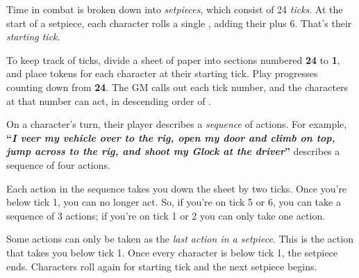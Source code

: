 
Time in combat is broken down into \emph{setpieces}, which consist of 24 \emph{ticks}. At the start of a setpiece, each character rolls a single , adding their  plus 6. That's their \emph{starting tick}.

To keep track of ticks, divide a sheet of paper into sections numbered \textbf{24} to \textbf{1}, and place tokens for each character at their starting tick. Play progresses counting down from \textbf{24}. The GM calls out each tick number, and the characters at that number can act, in descending order of .

On a character's turn, their player describes a \emph{sequence} of actions. For example, \textbf{``\emph{I veer my vehicle over to the rig, open my door and climb on top, jump across to the rig, and shoot my Glock at the driver}''} describes a sequence of four actions.

Each action in the sequence takes you down the sheet by two ticks. Once you're below tick 1, you can no longer act. So, if you're on tick 5 or 6, you can take a sequence of 3 actions; if you're on tick 1 or 2 you can only take one action.

Some actions can only be taken as the \emph{last action in a setpiece}. This is the action that takes you below tick 1. Once every character is below tick 1, the setpiece ends. Characters roll again for starting tick and the next setpiece begins.
